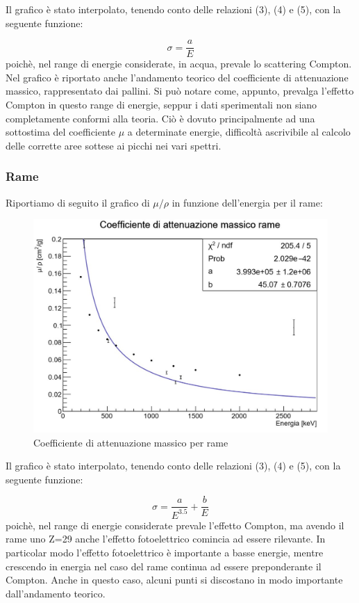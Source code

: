 \documentclass[a4paper,10pt]{article}
\begin{document}
\noindent Il grafico \`e stato interpolato, tenendo conto delle relazioni (3), (4) e (5), con la seguente funzione:

\begin{equation}
	\sigma = \frac{a}{E}
\end{equation}
\noindent poich\`e, nel range di energie considerate, in acqua, prevale lo scattering Compton. Nel grafico \`e riportato anche l'andamento teorico del coefficiente di attenuazione massico, rappresentato dai pallini. Si pu\`o notare come, appunto, prevalga l'effetto Compton in questo range di energie, seppur i dati sperimentali non siano completamente conformi alla teoria. Ci\`o \`e dovuto principalmente ad una sottostima del coefficiente $\mu$ a determinate energie, difficolt\`a ascrivibile al calcolo delle corrette aree sottese ai picchi nei vari spettri.  

\subsubsection{Rame}
Riportiamo di seguito il grafico di $\mu/\rho$ in funzione dell'energia per il rame:

\begin{figure}[H]
    \centering
    \includegraphics[scale=0.6]{grafici/massicorame}
    \caption{Coefficiente di attenuazione massico per rame}
\end{figure}

\noindent Il grafico \`e stato interpolato, tenendo conto delle relazioni (3), (4) e (5), con la seguente funzione:

\begin{equation}
	\sigma = \frac{a}{E^{3.5}} + \frac{b}{E}
\end{equation}
\noindent poich\`e, nel range di energie considerate prevale l'effetto Compton, ma avendo il rame uno Z=29 anche l'effetto fotoelettrico comincia ad essere rilevante. In particolar modo l'effetto fotoelettrico \`e importante a basse energie, mentre crescendo in energia nel caso del rame continua ad essere preponderante il Compton. Anche in questo caso, alcuni punti si discostano in modo importante dall'andamento teorico.
\end{document}
